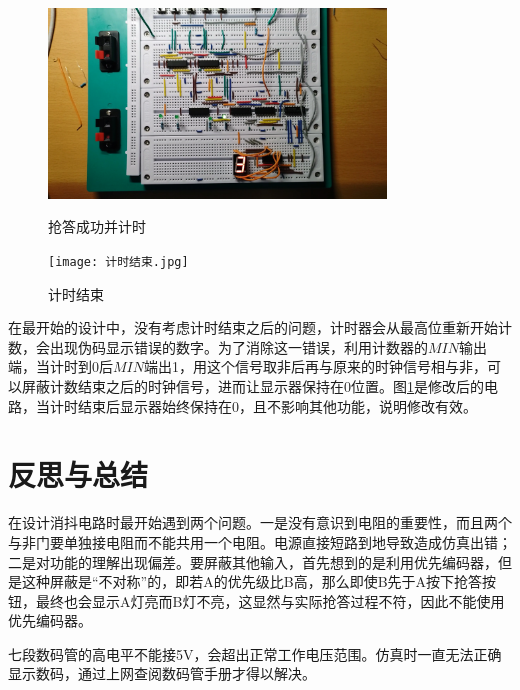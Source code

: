 \documentclass{ctexart}
\begin{document}
\begin{figure}[H]
    \centering
    \begin{minipage}{0.45\textwidth}
        \centering
               \includegraphics[width=0.8\textwidth]{计时中.jpg}
               \caption{抢答成功并计时}
        \label{7474}
        \end{minipage}
        \hspace{0.05\textwidth}
    \begin{minipage}{0.45\textwidth}
    \centering
           \texttt{[image: 计时结束.jpg]}
           \caption{计时结束}
    \label{计时结束}
    \end{minipage}    
\end{figure}
在最开始的设计中，没有考虑计时结束之后的问题，计时器会从最高位重新开始计数，会出现伪码显示错误的数字。为了消除这一错误，利用计数器的$MIN$输出端，当计时到0后$MIN$端出1，用这个信号取非后再与原来的时钟信号相与非，可以屏蔽计数结束之后的时钟信号，进而让显示器保持在0位置。图\ref{计时结束}是修改后的电路，当计时结束后显示器始终保持在0，且不影响其他功能，说明修改有效。
\section{反思与总结}
在设计消抖电路时最开始遇到两个问题。一是没有意识到电阻的重要性，而且两个与非门要单独接电阻而不能共用一个电阻。电源直接短路到地导致造成仿真出错；二是对功能的理解出现偏差。要屏蔽其他输入，首先想到的是利用优先编码器，但是这种屏蔽是“不对称”的，即若A的优先级比B高，那么即使B先于A按下抢答按钮，最终也会显示A灯亮而B灯不亮，这显然与实际抢答过程不符，因此不能使用优先编码器。

七段数码管的高电平不能接5V，会超出正常工作电压范围。仿真时一直无法正确显示数码，通过上网查阅数码管手册才得以解决。
\end{document}
